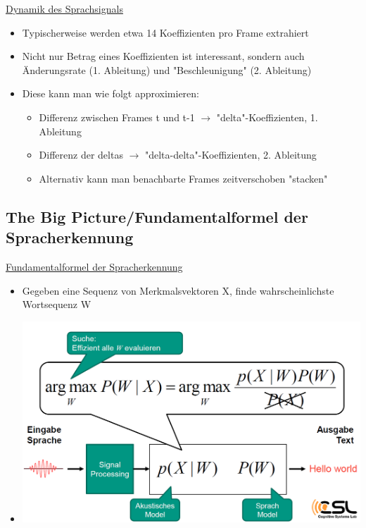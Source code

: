\documentclass[a4paper,10pt,oneside]{article}
\begin{document}
\underline{Dynamik des Sprachsignals} \\
	\begin{itemize}
		\item Typischerweise werden etwa 14 Koeffizienten pro Frame extrahiert
		\item Nicht nur Betrag eines Koeffizienten ist interessant, sondern auch Änderungsrate (1. Ableitung) und "Beschleunigung" (2. Ableitung)
		\item Diese kann man wie folgt approximieren:
			\begin{itemize}
				\item Differenz zwischen Frames t und t-1 $\rightarrow$ "delta"-Koeffizienten, 1. Ableitung
				\item Differenz der deltas $\rightarrow$ "delta-delta"-Koeffizienten, 2. Ableitung 
				\item Alternativ kann man benachbarte Frames zeitverschoben "stacken"
			\end{itemize}
	\end{itemize}
	
\subsection{The Big Picture/Fundamentalformel der Spracherkennung}

\underline{Fundamentalformel der Spracherkennung} \\
	\begin{itemize}
		\item Gegeben eine Sequenz von Merkmalsvektoren X, finde wahrscheinlichste Wortsequenz W
		\item[] \includegraphics[scale=0.2]{Grafiken/1332.png}
	\end{itemize}
	
\end{document}
